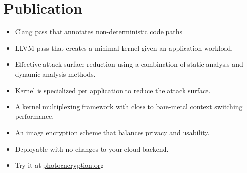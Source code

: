 \documentclass[11pt,a4paper,sans]{moderncv}
\begin{document}
\makecvtitle

\section{Publication}
{
    \begin{itemize}
        \item Clang pass that annotates non-deterministic code paths
        \item LLVM pass that creates a minimal kernel given an application
        workload.
        \item Effective attack surface reduction using a combination of static
        analysis and dynamic analysis methods.
    \end{itemize}
}

{
    \begin{itemize}
        \item Kernel is specialized per application to reduce the attack
        surface.
        \item A kernel multiplexing framework with close to bare-metal context
        switching performance.
    \end{itemize}
}

{
    \begin{itemize}
    \item An image encryption scheme that balances privacy and usability.
    \item Deployable with no changes to your cloud backend.
    \item Try it at \href{https://photoencryption.org}{photoencryption.org}
    \end{itemize}
}

\end{document}
